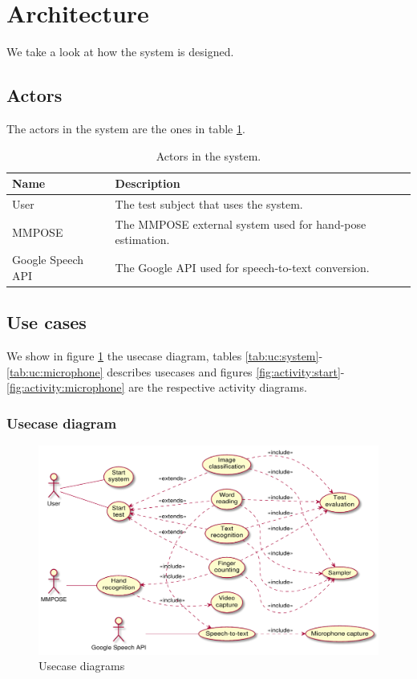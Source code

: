 \section{Architecture}
We take a look at how the system is designed.

\subsection{Actors}
The actors in the system are the ones in table \ref{tab:actors}.
\begin{table}[h!t]
    \caption{Actors in the system.}
    \label{tab:actors}
    \centering
    \begin{tabular}{l p{70mm}}
        \textbf{Name}     & \textbf{Description}                                      \\
        \hline
        User              & The test subject that uses the system.                    \\
        MMPOSE            & The MMPOSE external system used for hand-pose estimation. \\
        Google Speech API & The Google API used for speech-to-text conversion.
    \end{tabular}
\end{table}

\subsection{Use cases}
We show in figure \ref{fig:usecase:diagram} the usecase diagram, tables \ref{tab:uc:system}-\ref{tab:uc:microphone} describes usecases and figures \ref{fig:activity:start}-\ref{fig:activity:microphone} are the respective activity diagrams.

\subsubsection{Usecase diagram}
\begin{figure}[h!t]
    \centering
    \includegraphics[scale=0.55]{assets/plantuml/pdf/diagram.pdf}
    \caption{Usecase diagrams}
    \label{fig:usecase:diagram}
\end{figure}

